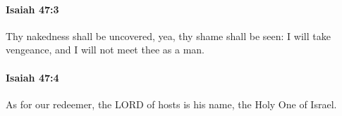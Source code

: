		\paragraph{Isaiah 47:3} %
			\label{ISAIAH-47-3}

			Thy nakedness shall be uncovered, yea, thy shame shall be seen: I will take vengeance, and I will not meet thee as a man.


		\paragraph{Isaiah 47:4} %
			\label{ISAIAH-47-4}

			As for our redeemer, the LORD of hosts is his name, the Holy One of Israel.


